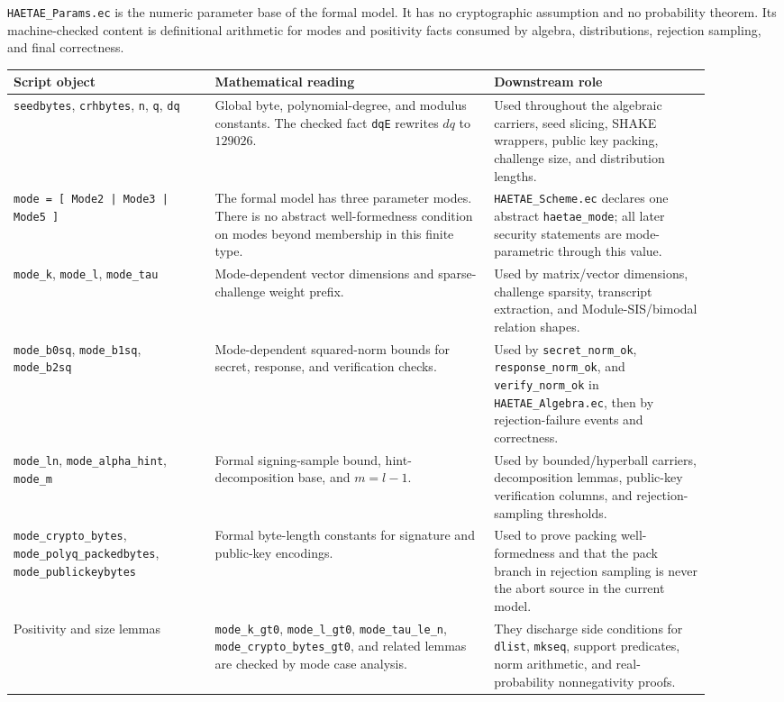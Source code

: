 \documentclass[11pt]{report}
\DeclareRobustCommand{\file}[1]{\ifmmode\text{\nolinkurl{#1}}\else\nolinkurl{#1}\fi}
\DeclareRobustCommand{\ec}[1]{\ifmmode\text{\nolinkurl{#1}}\else\nolinkurl{#1}\fi}
\theoremstyle{definition}
\theoremstyle{plain}
\begin{document}
\file{HAETAE\_Params.ec} is the numeric parameter base of the formal model.
It has no cryptographic assumption and no probability theorem.  Its
machine-checked content is definitional arithmetic for modes and positivity
facts consumed by algebra, distributions, rejection sampling, and final
correctness.

\begin{longtable}{p{0.26\linewidth}p{0.36\linewidth}p{0.28\linewidth}}
\toprule
\textbf{Script object} & \textbf{Mathematical reading} & \textbf{Downstream role} \\
\midrule
\ec{seedbytes}, \ec{crhbytes}, \ec{n}, \ec{q}, \ec{dq} &
Global byte, polynomial-degree, and modulus constants.  The checked fact
\ec{dqE} rewrites \(dq\) to \(129026\). &
Used throughout the algebraic carriers, seed slicing, SHAKE wrappers, public
key packing, challenge size, and distribution lengths. \\
\midrule
\ec{mode = [ Mode2 | Mode3 | Mode5 ]} &
The formal model has three parameter modes.  There is no abstract
well-formedness condition on modes beyond membership in this finite type. &
\ec{HAETAE\_Scheme.ec} declares one abstract \ec{haetae\_mode}; all later
security statements are mode-parametric through this value. \\
\midrule
\ec{mode\_k}, \ec{mode\_l}, \ec{mode\_tau} &
Mode-dependent vector dimensions and sparse-challenge weight prefix. &
Used by matrix/vector dimensions, challenge sparsity, transcript extraction,
and Module-SIS/bimodal relation shapes. \\
\midrule
\ec{mode\_b0sq}, \ec{mode\_b1sq}, \ec{mode\_b2sq} &
Mode-dependent squared-norm bounds for secret, response, and verification
checks. &
Used by \ec{secret\_norm\_ok}, \ec{response\_norm\_ok}, and
\ec{verify\_norm\_ok} in \file{HAETAE\_Algebra.ec}, then by rejection-failure
events and correctness. \\
\midrule
\ec{mode\_ln}, \ec{mode\_alpha\_hint}, \ec{mode\_m} &
Formal signing-sample bound, hint-decomposition base, and \(m=l-1\). &
Used by bounded/hyperball carriers, decomposition lemmas, public-key
verification columns, and rejection-sampling thresholds. \\
\midrule
\ec{mode\_crypto\_bytes}, \ec{mode\_polyq\_packedbytes},
\ec{mode\_publickeybytes} &
Formal byte-length constants for signature and public-key encodings. &
Used to prove packing well-formedness and that the pack branch in rejection
sampling is never the abort source in the current model. \\
\midrule
Positivity and size lemmas &
\ec{mode\_k\_gt0}, \ec{mode\_l\_gt0}, \ec{mode\_tau\_le\_n},
\ec{mode\_crypto\_bytes\_gt0}, and related lemmas are checked by mode case
analysis. &
They discharge side conditions for \ec{dlist}, \ec{mkseq}, support predicates,
norm arithmetic, and real-probability nonnegativity proofs. \\
\bottomrule
\end{longtable}
\end{document}
